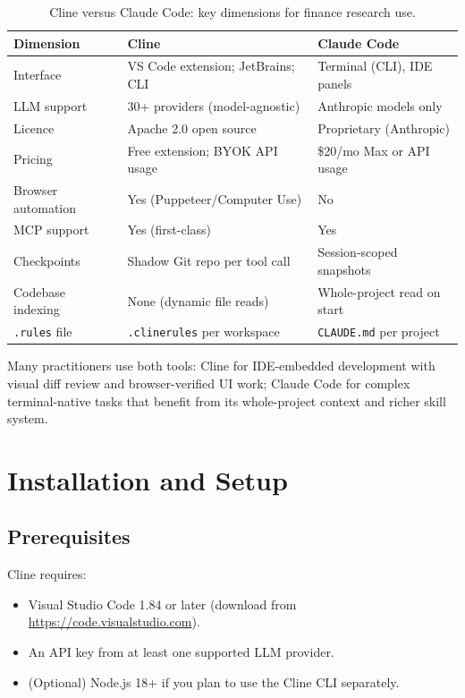 \begin{table}[ht]
\centering
\caption{Cline versus Claude Code: key dimensions for finance research use.}
\label{tab:cline-vs-claude-code}
\begin{tabular}{lll}
\toprule
\textbf{Dimension} & \textbf{Cline} & \textbf{Claude Code} \\
\midrule
Interface          & VS Code extension; JetBrains; CLI & Terminal (CLI), IDE panels \\
LLM support        & 30+ providers (model-agnostic) & Anthropic models only \\
Licence            & Apache 2.0 open source & Proprietary (Anthropic) \\
Pricing            & Free extension; BYOK API usage & \$20/mo Max or API usage \\
Browser automation & Yes (Puppeteer/Computer Use) & No \\
MCP support        & Yes (first-class) & Yes \\
Checkpoints        & Shadow Git repo per tool call & Session-scoped snapshots \\
Codebase indexing  & None (dynamic file reads) & Whole-project read on start \\
\texttt{.rules} file & \texttt{.clinerules} per workspace & \texttt{CLAUDE.md} per project \\
\bottomrule
\end{tabular}
\end{table}

Many practitioners use both tools: Cline for IDE-embedded development with
visual diff review and browser-verified UI work; Claude Code for complex
terminal-native tasks that benefit from its whole-project context and richer
skill system.

\section{Installation and Setup}
\label{app:cline:install}

\subsection{Prerequisites}
\label{app:cline:prereqs}

Cline requires:
\begin{itemize}
  \item Visual Studio Code 1.84 or later (download from \url{https://code.visualstudio.com}).
  \item An API key from at least one supported LLM provider.
  \item (Optional) Node.js 18+ if you plan to use the Cline CLI separately.
\end{itemize}

